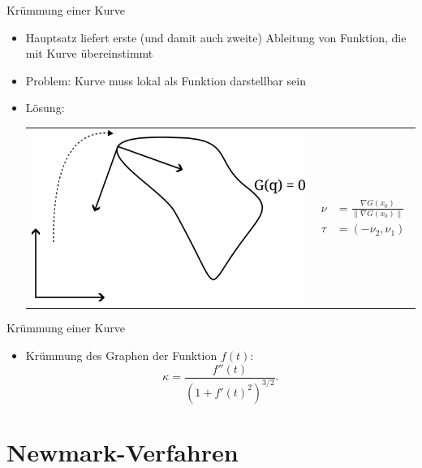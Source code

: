 \documentclass[aspectratio=169]{beamer}
\begin{document}
\begin{frame}{Krümmung einer Kurve}
\begin{itemize}[<+->]
    \item Hauptsatz liefert erste (und damit auch zweite) Ableitung von Funktion,
        die mit Kurve übereinstimmt
    \item Problem: Kurve muss lokal als Funktion darstellbar sein
    \item Lösung:

    \begin{tabular}[t]{l c}
    \includegraphics[scale=0.7]{./trafo.png} &
    {$\!\begin{aligned} %
        \nu &= \frac{ \nabla G(x_0) }{ \| \nabla G(x_0) \| } \\
        \tau &= (-\nu_2, \nu_1)
        \end{aligned}$}
    \end{tabular}
\end{itemize}
\end{frame}

\begin{frame}{Krümmung einer Kurve}
\begin{itemize}
    \item Krümmung des Graphen der Funktion $f(t)$:
        \begin{equation*}
        \kappa = \frac{f''(t)}{(1 + f'(t)^2)^{3/2}}.
        \end{equation*}
\end{itemize}
\end{frame}


\section{Newmark-Verfahren}
\end{document}
